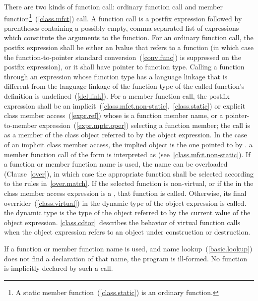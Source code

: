 \pnum
{}%
%
%
There are two kinds of function call: ordinary function call and member
function\footnote{A static member function~(\ref{class.static}) is an ordinary
function.}~(\ref{class.mfct}) call.
A function call is a postfix expression followed by parentheses
containing a possibly empty, comma-separated list of expressions which
constitute the arguments to the function. For an ordinary function call,
the postfix expression shall be either an lvalue that refers to a
function (in which case the function-to-pointer standard
conversion~(\ref{conv.func}) is suppressed on the postfix expression),
or it shall have pointer to function type. Calling a function through an
expression whose function type has a language linkage that is different
from the language linkage of the function type of the called function's
definition is undefined~(\ref{dcl.link}). For a member function call,
the postfix expression shall be an
implicit~(\ref{class.mfct.non-static},~\ref{class.static}) or explicit
class member access~(\ref{expr.ref}) whose  is a
function member name, or a pointer-to-member
expression~(\ref{expr.mptr.oper}) selecting a function member; the call is as a member of
the class object referred to by the
object expression. In the case of an implicit class
member access, the implied object is the one pointed to by .
\enternote 
a member function call of the form  is interpreted as
 (see~\ref{class.mfct.non-static}).
\exitnote 
If a function or member function name is used, the name can be
overloaded (Clause~\ref{over}), in which case the appropriate function
shall be selected according to the rules in~\ref{over.match}. If the selected
function is non-virtual, or if the  in the class
member access expression is a , that function is
called. Otherwise, its final overrider~(\ref{class.virtual}) in the dynamic type
of the object expression is called.
\enternote 
the dynamic type is the type of the object referred to by the
current value of the object expression. \ref{class.cdtor}~describes the
behavior of virtual function calls when the object expression
refers to
an object under construction or destruction.
\exitnote 

\pnum
\enternote
If a function or member function name is used, and name
lookup~(\ref{basic.lookup}) does not find a declaration of that name,
the program is ill-formed. No function is implicitly declared by such a
call.
\exitnote

